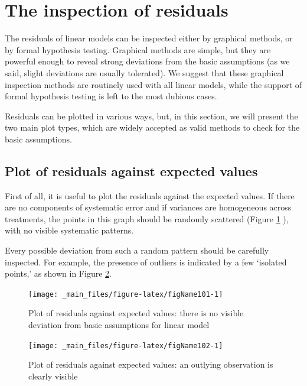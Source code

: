 \documentclass[a4paper,12pt,oneside]{book}
\begin{document}
\hypertarget{the-inspection-of-residuals}{%
\section{The inspection of residuals}\label{the-inspection-of-residuals}}

The residuals of linear models can be inspected either by graphical methods, or by formal hypothesis testing. Graphical methods are simple, but they are powerful enough to reveal strong deviations from the basic assumptions (as we said, slight deviations are usually tolerated). We suggest that these graphical inspection methods are routinely used with all linear models, while the support of formal hypothesis testing is left to the most dubious cases.

Residuals can be plotted in various ways, but, in this section, we will present the two main plot types, which are widely accepted as valid methods to check for the basic assumptions.

\hypertarget{plot-of-residuals-against-expected-values}{%
\subsection{Plot of residuals against expected values}\label{plot-of-residuals-against-expected-values}}

First of all, it is useful to plot the residuals against the expected values. If there are no components of systematic error and if variances are homogeneous across treatments, the points in this graph should be randomly scattered (Figure \ref{fig:figName101} ), with no visible systematic patterns.

Every possible deviation from such a random pattern should be carefully inspected. For example, the presence of outliers is indicated by a few `isolated points,' as shown in Figure \ref{fig:figName102}.

\begin{figure}

{\centering \texttt{[image: \_main\_files/figure-latex/figName101-1]} 

}

\caption{Plot of residuals against expected values: there is no visible deviation from basic assumptions for linear model}\label{fig:figName101}
\end{figure}

\begin{figure}

{\centering \texttt{[image: \_main\_files/figure-latex/figName102-1]} 

}

\caption{Plot of residuals against expected values: an outlying observation is clearly visible}\label{fig:figName102}
\end{figure}
\end{document}
